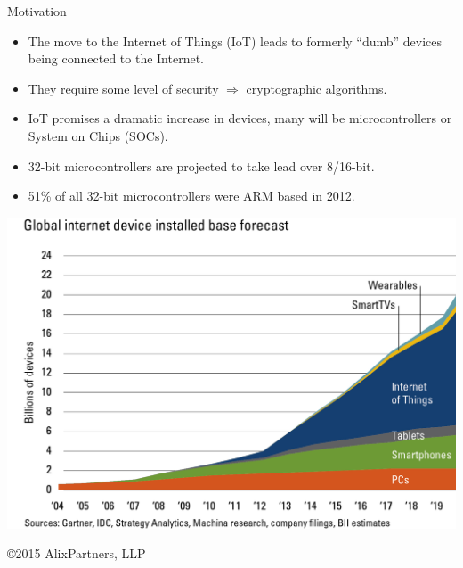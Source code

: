 \documentclass[xcolor=pdftex,dvipsnames,table,final]{beamer}
\begin{document}
\begin{frame}[fragile]{}
\begin{columns}[t, totalwidth=\textwidth]
\begin{column}{.31\linewidth}
      \begin{block}{Motivation}
        \begin{itemize}
          \item The move to the Internet of Things (IoT) leads to formerly 
                ``dumb'' devices being connected to the Internet.
          \item They require some level of security $\Rightarrow$ cryptographic algorithms.
          \item IoT promises a dramatic increase in devices, many will be microcontrollers or System on Chips (SOCs).
          \item 32-bit microcontrollers are projected to take lead over 8/16-bit.%
          \item 51\% of all 32-bit microcontrollers were ARM based in 2012.
        \end{itemize}
        \begin{center}
          \includegraphics[scale=1.0]{figures/IMS-Internet_of_things.png}
      
          \vspace{-1ex}
          {\tiny \copyright 2015 AlixPartners, LLP}
        \end{center}
      \end{block}
	 

\end{column}
\end{columns}
\end{frame}
\end{document}
